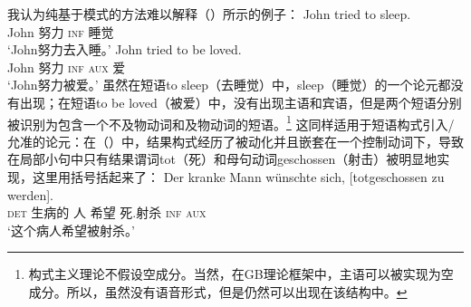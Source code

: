 \begin{exe}
\begin{xlist}[iv.]
\begin{exe}
\begin{xlist}[iv.]
我认为纯基于模式的方法难以解释（）所示的例子：
\eal
\ex 
\gll John tried to sleep.\\
     John 努力 \textsc{inf} 睡觉\\
\glt `John努力去入睡。'
\ex
\gll John tried to be loved.\\
     John 努力 \textsc{inf} \textsc{aux} 爱\\
\glt `John努力被爱。' 
\zl
虽然在短语to sleep（去睡觉）中，sleep（睡觉）的一个论元都没有出现；在短语to be loved（被爱）中，没有出现主语和宾语，但是两个短语分别被识别为包含一个不及物动词和及物动词的短语。\footnote{%
构式主义理论不假设空成分。当然，在GB理论框架中，主语可以被实现为空成分。所以，虽然没有语音形式，但是仍然可以出现在该结构中。%
}  
这同样适用于短语构式引入/允准的论元：在（）中，结果构式经历了被动化并且嵌套在一个控制动词下，导致在局部小句中只有结果谓词tot（死）和母句动词geschossen（射击）被明显地实现，这里用括号括起来了：
\ea
\gll Der kranke Mann wünschte sich,   [totgeschossen zu werden].\footnotemark\\
     \textsc{det} 生病的   人  希望   \self{} \spacebr{}死.射杀      \textsc{inf} \textsc{aux}\\
\glt `这个病人希望被射杀。'

\end{xlist}
\end{exe}
\end{xlist}
\end{exe}
